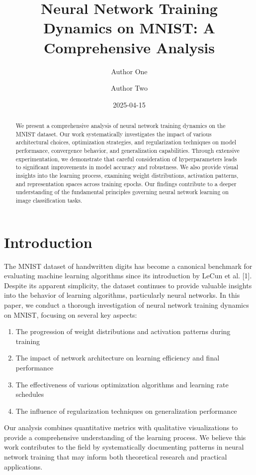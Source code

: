 \documentclass[
  11pt,
  twocolumn,
  a4paper]{article}
\title{Neural Network Training Dynamics on MNIST: A Comprehensive
Analysis}
\author{Author One \and Author Two}
\date{2025-04-15}
\providecommand{\tightlist}{%
  \setlength{\itemsep}{0pt}\setlength{\parskip}{0pt}}\usepackage{longtable,booktabs,array}
\begin{document}
\maketitle
\begin{abstract}
We present a comprehensive analysis of neural network training dynamics
on the MNIST dataset. Our work systematically investigates the impact of
various architectural choices, optimization strategies, and
regularization techniques on model performance, convergence behavior,
and generalization capabilities. Through extensive experimentation, we
demonstrate that careful consideration of hyperparameters leads to
significant improvements in model accuracy and robustness. We also
provide visual insights into the learning process, examining weight
distributions, activation patterns, and representation spaces across
training epochs. Our findings contribute to a deeper understanding of
the fundamental principles governing neural network learning on image
classification tasks.
\end{abstract}


\section{Introduction}\label{introduction}

The MNIST dataset of handwritten digits has become a canonical benchmark
for evaluating machine learning algorithms since its introduction by
LeCun et al. {[}1{]}. Despite its apparent simplicity, the dataset
continues to provide valuable insights into the behavior of learning
algorithms, particularly neural networks. In this paper, we conduct a
thorough investigation of neural network training dynamics on MNIST,
focusing on several key aspects:

\begin{enumerate}
\def\labelenumi{\arabic{enumi}.}
\tightlist
\item
  The progression of weight distributions and activation patterns during
  training
\item
  The impact of network architecture on learning efficiency and final
  performance
\item
  The effectiveness of various optimization algorithms and learning rate
  schedules
\item
  The influence of regularization techniques on generalization
  performance
\end{enumerate}

Our analysis combines quantitative metrics with qualitative
visualizations to provide a comprehensive understanding of the learning
process. We believe this work contributes to the field by systematically
documenting patterns in neural network training that may inform both
theoretical research and practical applications.
\end{document}
